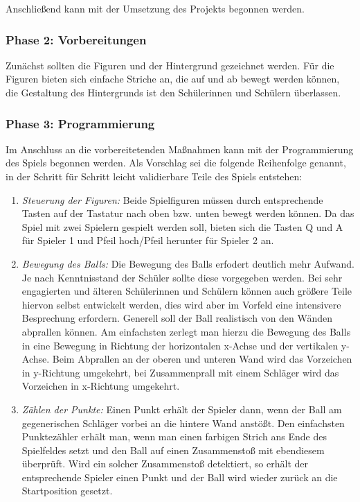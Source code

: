 Anschließend kann mit der Umsetzung des Projekts begonnen werden.

\subsubsection{Phase 2: Vorbereitungen}\label{phase-2-vorbereitungen}

Zunächst sollten die Figuren und der Hintergrund gezeichnet werden. Für
die Figuren bieten sich einfache Striche an, die auf und ab bewegt
werden können, die Gestaltung des Hintergrunds ist den Schülerinnen und
Schülern überlassen.

\subsubsection{Phase 3: Programmierung}\label{phase-3-programmierung}

Im Anschluss an die vorbereitetenden Maßnahmen kann mit der
Programmierung des Spiels begonnen werden. Als Vorschlag sei die
folgende Reihenfolge genannt, in der Schritt für Schritt leicht
validierbare Teile des Spiels entstehen:

\begin{enumerate}
\item
  \emph{Steuerung der Figuren:} Beide Spielfiguren müssen durch
  entsprechende Tasten auf der Tastatur nach oben bzw. unten bewegt
  werden können. Da das Spiel mit zwei Spielern gespielt werden soll,
  bieten sich die Tasten Q und A für Spieler 1 und Pfeil hoch/Pfeil
  herunter für Spieler 2 an.
\item
  \emph{Bewegung des Balls:} Die Bewegung des Balls erfodert deutlich
  mehr Aufwand. Je nach Kenntnisstand der Schüler sollte diese
  vorgegeben werden. Bei sehr engagierten und älteren Schülerinnen und
  Schülern können auch größere Teile hiervon selbst entwickelt werden,
  dies wird aber im Vorfeld eine intensivere Besprechung erfordern.
  Generell soll der Ball realistisch von den Wänden abprallen können. Am
  einfachsten zerlegt man hierzu die Bewegung des Balls in eine Bewegung
  in Richtung der horizontalen x-Achse und der vertikalen y-Achse. Beim
  Abprallen an der oberen und unteren Wand wird das Vorzeichen in
  y-Richtung umgekehrt, bei Zusammenprall mit einem Schläger wird das
  Vorzeichen in x-Richtung umgekehrt.
\item
  \emph{Zählen der Punkte:} Einen Punkt erhält der Spieler dann, wenn
  der Ball am gegenerischen Schläger vorbei an die hintere Wand anstößt.
  Den einfachsten Punktezähler erhält man, wenn man einen farbigen
  Strich ans Ende des Spielfeldes setzt und den Ball auf einen
  Zusammenstoß mit ebendiesem überprüft. Wird ein solcher Zusammenstoß
  detektiert, so erhält der entsprechende Spieler einen Punkt und der
  Ball wird wieder zurück an die Startposition gesetzt.
\end{enumerate}

